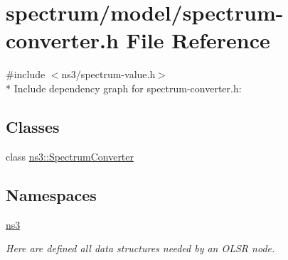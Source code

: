 \hypertarget{spectrum-converter_8h}{}\section{spectrum/model/spectrum-\/converter.h File Reference}
\label{spectrum-converter_8h}
{\ttfamily \#include $<$ns3/spectrum-\/value.\+h$>$}\\*
Include dependency graph for spectrum-\/converter.h\+:
\subsection*{Classes}
\begin{DoxyCompactItemize}
\item 
class \hyperlink{classns3_1_1SpectrumConverter}{ns3\+::\+Spectrum\+Converter}
\end{DoxyCompactItemize}
\subsection*{Namespaces}
\begin{DoxyCompactItemize}
\item 
 \hyperlink{namespacens3}{ns3}
\begin{DoxyCompactList}\small\item\em Here are defined all data structures needed by an O\+L\+SR node. \end{DoxyCompactList}\end{DoxyCompactItemize}
